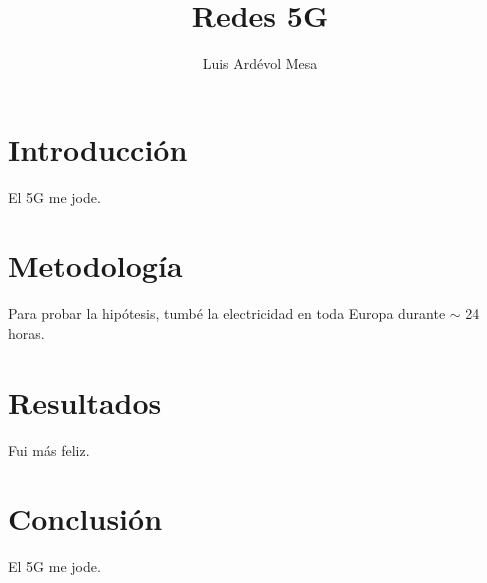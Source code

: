 \documentclass[11pt]{opticajnl}
\title{Redes 5G}
\author[1,2,3]{Luis Ardévol Mesa}
\begin{document}
\maketitle

\section{Introducción}

El 5G me jode.

\section{Metodología}

Para probar la hipótesis, tumbé la electricidad en toda Europa durante $\sim$ 24 horas. 

\section{Resultados}

Fui más feliz.

\section{Conclusión}

El 5G me jode. 
\end{document}

